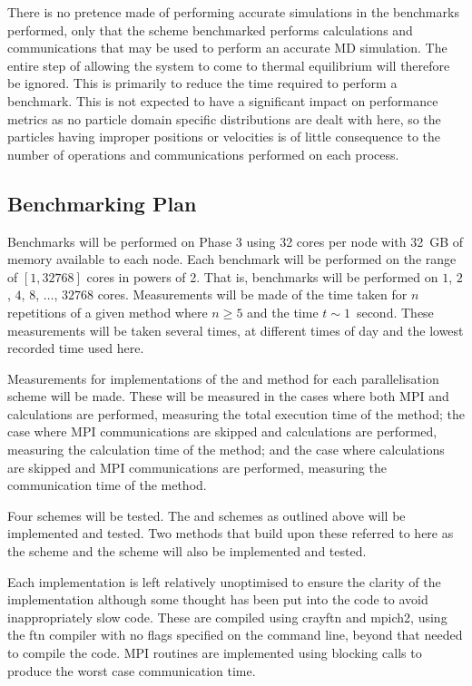 %
There is no pretence made of performing accurate simulations in
the benchmarks performed,
only that the scheme benchmarked performs calculations and
communications that may be used to perform an accurate MD simulation.
%
The entire step of allowing the system to come to
thermal equilibrium will therefore be ignored.
%
This is primarily to reduce the time required to perform a benchmark.
%
This is not expected to have a significant impact on performance metrics
as no particle domain specific distributions are dealt with here,
so the particles having improper positions or velocities is of
little consequence to the number of operations and communications
performed on each process.


\subsection{Benchmarking Plan}

Benchmarks will be performed on \hector{} Phase 3 using
32 cores per node with 32~GB of memory available to each node.
%
Each benchmark will be performed on the range of $[1,32768]$ cores
in powers of 2.
%
That is, benchmarks will be performed on
$1$, $2$, $4$, $8$, $\dots{}$, $32768$ cores.
%
Measurements will be made of the time taken for $n$ repetitions of a given
method where $n \ge{} 5$ and the time $t \sim{} 1$~second.
%
These measurements will be taken several times, at different times of
day and the lowest recorded time used here.

Measurements for implementations of
the \individualoperation{} and \pairoperation{} method
for each parallelisation scheme will be made.
%
These will be measured in the cases where both MPI and calculations
are performed, measuring the total execution time of the method;
the case where MPI communications are skipped and calculations are
performed, measuring the calculation time of the method; and
the case where calculations are skipped and MPI communications are
performed, measuring the communication time of the method.

Four schemes will be tested.
%
The \replicateddata{} and \systolicloop{} schemes as outlined above
will be implemented and tested.
%
Two methods that build upon these referred to here as
the \sharedandreplicateddata{} scheme and the \replicatedsystolicloop{} scheme
will also be implemented and tested.

Each implementation is left relatively unoptimised to ensure
the clarity of the implementation although
some thought has been put into the code to avoid inappropriately slow code.
%
These are compiled using crayftn and mpich2, using the ftn compiler with
no flags specified on the command line, beyond that needed to compile
the code.
%
MPI routines are implemented using blocking calls to produce the worst
case communication time.

